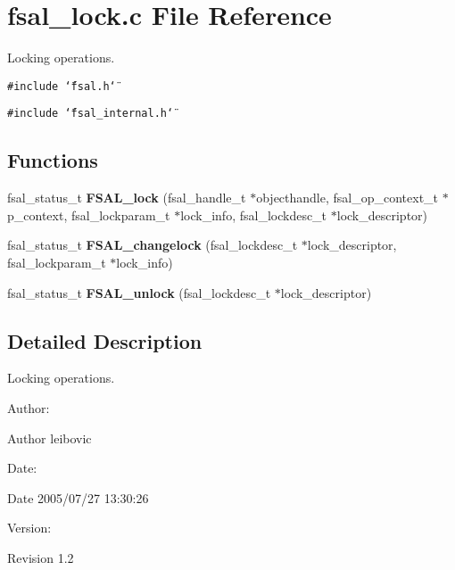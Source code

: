 \section{fsal\_\-lock.c File Reference}
\label{fsal__lock_8c}
Locking operations.  


{\tt \#include \char`\"{}fsal.h\char`\"{}}\par
{\tt \#include \char`\"{}fsal\_\-internal.h\char`\"{}}\par
\subsection*{Functions}
\begin{CompactItemize}
\item 
fsal\_\-status\_\-t {\bf FSAL\_\-lock} (fsal\_\-handle\_\-t $\ast$objecthandle, fsal\_\-op\_\-context\_\-t $\ast$p\_\-context, fsal\_\-lockparam\_\-t $\ast$lock\_\-info, fsal\_\-lockdesc\_\-t $\ast$lock\_\-descriptor)
\item 
fsal\_\-status\_\-t {\bf FSAL\_\-changelock} (fsal\_\-lockdesc\_\-t $\ast$lock\_\-descriptor, fsal\_\-lockparam\_\-t $\ast$lock\_\-info)
\item 
fsal\_\-status\_\-t {\bf FSAL\_\-unlock} (fsal\_\-lockdesc\_\-t $\ast$lock\_\-descriptor)
\end{CompactItemize}


\subsection{Detailed Description}
Locking operations. 

\begin{Desc}
\item[Author:]\end{Desc}
\begin{Desc}
\item[Author]leibovic \end{Desc}
\begin{Desc}
\item[Date:]\end{Desc}
\begin{Desc}
\item[Date]2005/07/27 13:30:26 \end{Desc}
\begin{Desc}
\item[Version:]\end{Desc}
\begin{Desc}
\item[Revision]1.2 \end{Desc}


